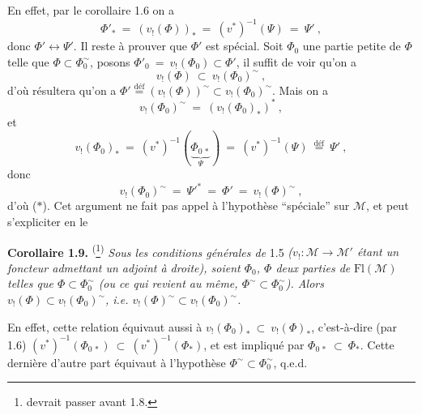 \documentclass[11pt]{article}
\newcommand{\printedpage}[1]{\marginpar{\footnotesize p.~#1}}
\newcommand{\msp}[1]{\marginpar{\footnotesize [#1]}}
\newcommand{\clos}{\longleftrightarrow}
\newcommand{\fl}{\longrightarrow}
\begin{document}
En effet, par le corollaire 1.6 on a
\[
\Phi'_{*} \ =\ (v_{!}(\Phi))_{*} \ =\ (v^{*})^{-1}(\Psi) \ =\ \Psi'\ ,
\]
donc $\Phi' \clos \Psi'$. Il reste à prouver que $\Phi'$ est spécial. Soit $\Phi_0$ une partie petite de $\Phi$ telle que $\Phi \subset \Phi_0^{\sim}$, posons $\Phi'_0 \ =\ v_{!}(\Phi_0) \subset \Phi'$, \msp{page 9} il suffit de voir qu'on a
\[
v_{!}(\Phi) \ \subset\ v_{!}(\Phi_0)^{\sim}\ , \tag*{($*$)}
\]
d'où résultera qu'on a $\Phi' \overset{\text{déf}}{=} (v_{!}(\Phi))^{\sim} \subset v_{!}(\Phi_0)^{\sim}$. Mais on a
\[
v_{!}(\Phi_0)^{\sim} \ =\ (v_{!}(\Phi_0)_{*})^{*}\ ,
\]
\printedpage{6}
et
\[
v_{!}(\Phi_0)_{*} \ =\ (v^{*})^{-1}(\underbrace{\Phi_{0\,*}}_{\Psi}) \ =\ (v^{*})^{-1}(\Psi) \ \overset{\text{déf}}{=}\ \Psi'\ ,
\]
donc
\[
v_{!}(\Phi_0)^{\sim} \ =\ \Psi'^{*} \ =\ \Phi' \ =\ v_{!}(\Phi)^{\sim}\ ,
\]
d'où ($*$). Cet argument ne fait pas appel à l'hypothèse “spéciale” sur $\mathcal{M}$, et peut s'expliciter en le

\textbf{Corollaire 1.9.} \textsuperscript{(}\footnote[4]{devrait passer avant 1.8.}\textsuperscript{)} \textit{Sous les conditions générales de} 1.5 \textit{($v_{!} : \mathcal{M} \fl \mathcal{M}'$ étant un foncteur admettant un adjoint à droite), soient $\Phi_0$, $\Phi$ deux parties de} $\mathrm{Fl}(\mathcal{M})$ \textit{telles que $\Phi \subset \Phi_0^{\sim}$ (ou ce qui revient au même, $\Phi^{\sim} \subset \Phi_0^{\sim}$). Alors $v_{!}(\Phi) \subset v_{!}(\Phi_0)^{\sim}$, i.e. $v_{!}(\Phi)^{\sim} \subset v_{!}(\Phi_0)^{\sim}$.}

En effet, cette relation équivaut aussi à $v_{!}(\Phi_0)_{*} \ \subset\ v_{!}(\Phi)_{*}$, c'est-à-dire (par 1.6) $(v^{*})^{-1}(\Phi_{0\,*}) \ \subset\ (v^{*})^{-1}(\Phi_{*})$, et est impliqué par $\Phi_{0\,*} \ \subset\ \Phi_{*}$. Cette dernière d'autre part équivaut à l'hypothèse $\Phi^{\sim} \subset \Phi_0^{\sim}$, q.e.d.
\end{document}
